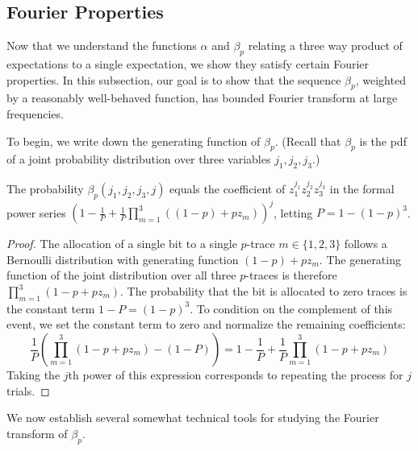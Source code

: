 \documentclass[11pt]{article}
\theoremstyle{plain}
\begin{document}
\subsection{Fourier Properties}

Now that we understand the functions $\alpha$ and $\beta_p$ relating a three way product of expectations to a single expectation, we show they satisfy certain Fourier properties. In this subsection, our goal is to show that the sequence $\beta_p$, weighted by a reasonably well-behaved function, has bounded Fourier transform at large frequencies. 

To begin, we write down the generating function of $\beta_p$. (Recall that $\beta_p$ is the pdf of a joint probability distribution over three variables $j_1,j_2,j_3$.)

\begin{lemma}
The probability $\beta_p(j_1,j_2,j_3,j)$ equals the coefficient of $z_1^{j_1}z_2^{j_2}z_3^{j_3}$ in the formal power series $\left(1-\frac{1}{P}+\frac{1}{P}\prod_{m=1}^3((1-p)+pz_m)\right)^j$, letting $P = 1-(1-p)^3$.
\end{lemma}
\begin{proof}
    The allocation of a single bit to a single $p$-trace $m \in \{1,2,3\}$ follows a Bernoulli distribution with generating function $(1-p) + pz_m$. The generating function of the joint distribution over all three $p$-traces is therefore $\prod_{m=1}^3 (1 - p + pz_m)$. The probability that the bit is allocated to zero traces is the constant term $1 - P = (1-p)^3$. To condition on the complement of this event, we set the constant term to zero and normalize the remaining coefficients: 
    \begin{equation*}
        \frac{1}{P} \left( \prod_{m=1}^3 (1-p + pz_m) - (1-P) \right) = 1 - \frac{1}{P} + \frac{1}{P} \prod_{m=1}^3 (1-p + pz_m)
    \end{equation*}
    Taking the $j$th power of this expression corresponds to repeating the process for $j$ trials.  
\end{proof}

We now establish several somewhat technical tools for studying the Fourier transform of $\beta_p$. 
\end{document}
